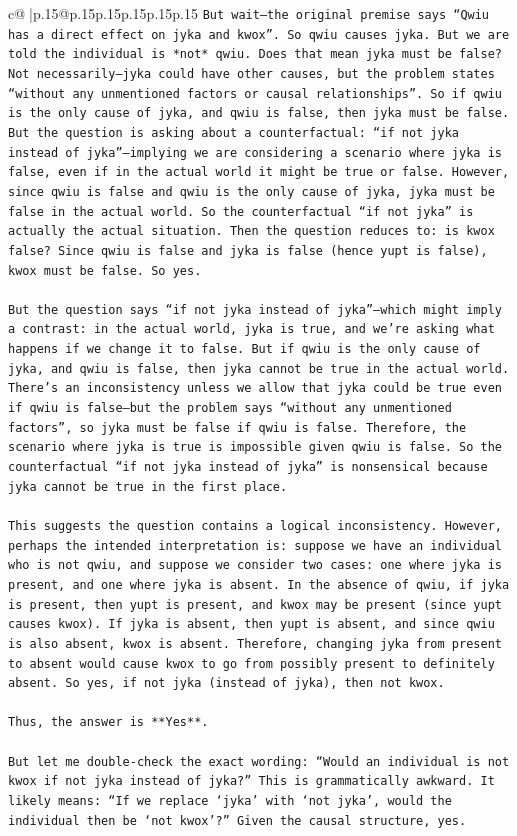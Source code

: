 \documentclass{article}
\begin{document}
{\begin{supertabular}{c@{$\;$}|p{.15\linewidth}@{}p{.15\linewidth}p{.15\linewidth}p{.15\linewidth}p{.15\linewidth}p{.15\linewidth}}
{{{\texttt{But wait—the original premise says “Qwiu has a direct effect on jyka and kwox”. So qwiu causes jyka. But we are told the individual is *not* qwiu. Does that mean jyka must be false? Not necessarily—jyka could have other causes, but the problem states “without any unmentioned factors or causal relationships”. So if qwiu is the only cause of jyka, and qwiu is false, then jyka must be false. But the question is asking about a counterfactual: “if not jyka instead of jyka”—implying we are considering a scenario where jyka is false, even if in the actual world it might be true or false. However, since qwiu is false and qwiu is the only cause of jyka, jyka must be false in the actual world. So the counterfactual “if not jyka” is actually the actual situation. Then the question reduces to: is kwox false? Since qwiu is false and jyka is false (hence yupt is false), kwox must be false. So yes.} \\
\\ 
\texttt{But the question says “if not jyka instead of jyka”—which might imply a contrast: in the actual world, jyka is true, and we’re asking what happens if we change it to false. But if qwiu is the only cause of jyka, and qwiu is false, then jyka cannot be true in the actual world. There’s an inconsistency unless we allow that jyka could be true even if qwiu is false—but the problem says “without any unmentioned factors”, so jyka must be false if qwiu is false. Therefore, the scenario where jyka is true is impossible given qwiu is false. So the counterfactual “if not jyka instead of jyka” is nonsensical because jyka cannot be true in the first place.} \\
\\ 
\texttt{This suggests the question contains a logical inconsistency. However, perhaps the intended interpretation is: suppose we have an individual who is not qwiu, and suppose we consider two cases: one where jyka is present, and one where jyka is absent. In the absence of qwiu, if jyka is present, then yupt is present, and kwox may be present (since yupt causes kwox). If jyka is absent, then yupt is absent, and since qwiu is also absent, kwox is absent. Therefore, changing jyka from present to absent would cause kwox to go from possibly present to definitely absent. So yes, if not jyka (instead of jyka), then not kwox.} \\
\\ 
\texttt{Thus, the answer is **Yes**.} \\
\\ 
\texttt{But let me double{-}check the exact wording: “Would an individual is not kwox if not jyka instead of jyka?” This is grammatically awkward. It likely means: “If we replace ‘jyka’ with ‘not jyka’, would the individual then be ‘not kwox’?” Given the causal structure, yes.} \\
}}}
\end{supertabular}}
\end{document}
